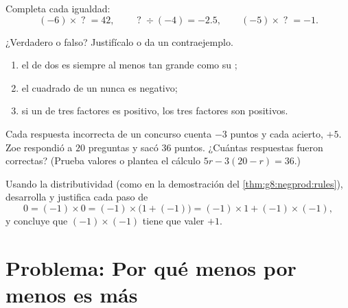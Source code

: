 \begin{exercise}[$\star\star$]\label{exo:g8:negprod:8}
Completa cada igualdad:
\[
(-6) \times \;?\; = 42, \qquad
\;?\; \div (-4) = -2.5, \qquad
(-5) \times \;?\; = -1 .
\]
\end{exercise}

\begin{exercise}[$\star\star$]\label{exo:g8:negprod:9}
¿Verdadero o falso? Justifícalo o da un contraejemplo.
\begin{enumerate}
  \item el  de dos  es siempre al menos tan
        grande como su ;
  \item el cuadrado de un  nunca es negativo;
  \item si un  de tres factores es positivo, los tres factores
        son positivos.
\end{enumerate}
\end{exercise}

\begin{exercise}[$\star\star$]\label{exo:g8:negprod:10}
Cada respuesta incorrecta de un concurso cuenta $-3$ puntos y cada acierto,
$+5$. Zoe respondió a $20$ preguntas y sacó $36$ puntos. ¿Cuántas
respuestas fueron correctas? (Prueba valores o plantea el cálculo
$5r - 3(20 - r) = 36$.)
\end{exercise}

\begin{exercise}[$\star\star\star$]\label{exo:g8:negprod:11}
Usando la distributividad (como en la demostración del
\cref{thm:g8:negprod:rules}), desarrolla y justifica cada paso de
\[
0 = (-1) \times 0 = (-1) \times \bigl(1 + (-1)\bigr)
= (-1) \times 1 + (-1) \times (-1),
\]
y concluye que $(-1) \times (-1)$ tiene que valer $+1$.
\end{exercise}

\section{Problema: Por qué menos por menos es más}

